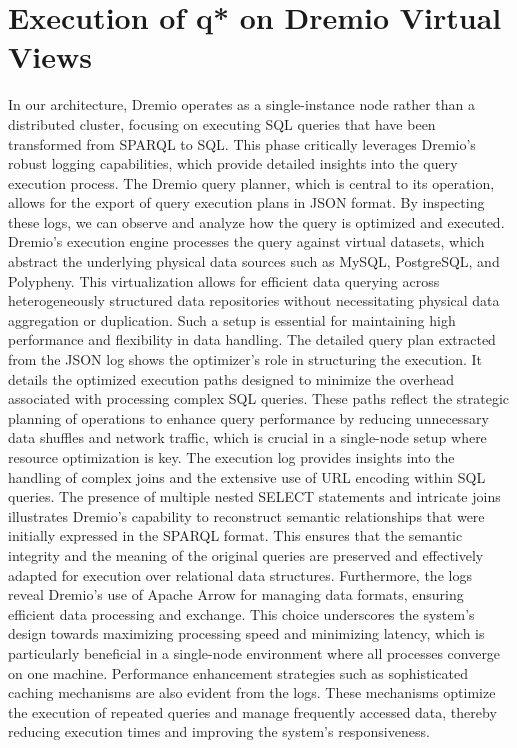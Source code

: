 \section{Execution of q* on Dremio Virtual Views}
In our architecture, Dremio operates as a single-instance node rather than a distributed cluster, focusing on executing SQL queries that have been transformed from SPARQL to SQL. This phase critically leverages Dremio's robust logging capabilities, which provide detailed insights into the query execution process. The Dremio query planner, which is central to its operation, allows for the export of query execution plans in JSON format. By inspecting these logs, we can observe and analyze how the query is optimized and executed.
Dremio's execution engine processes the query against virtual datasets, which abstract the underlying physical data sources such as MySQL, PostgreSQL, and Polypheny. This virtualization allows for efficient data querying across heterogeneously structured data repositories without necessitating physical data aggregation or duplication. Such a setup is essential for maintaining high performance and flexibility in data handling.
The detailed query plan extracted from the JSON log shows the optimizer's role in structuring the execution. It details the optimized execution paths designed to minimize the overhead associated with processing complex SQL queries. These paths reflect the strategic planning of operations to enhance query performance by reducing unnecessary data shuffles and network traffic, which is crucial in a single-node setup where resource optimization is key.
The execution log provides insights into the handling of complex joins and the extensive use of URL encoding within SQL queries. The presence of multiple nested SELECT statements and intricate joins illustrates Dremio's capability to reconstruct semantic relationships that were initially expressed in the SPARQL format. This ensures that the semantic integrity and the meaning of the original queries are preserved and effectively adapted for execution over relational data structures.
Furthermore, the logs reveal Dremio's use of Apache Arrow for managing data formats, ensuring efficient data processing and exchange. This choice underscores the system's design towards maximizing processing speed and minimizing latency, which is particularly beneficial in a single-node environment where all processes converge on one machine.
Performance enhancement strategies such as sophisticated caching mechanisms are also evident from the logs. These mechanisms optimize the execution of repeated queries and manage frequently accessed data, thereby reducing execution times and improving the system's responsiveness.
